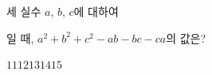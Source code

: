 세 실수 $a$, $b$, $c$에 대하여\par\smallskip{}\par\smallskip\noindent 일 때, $a^2+b^2+c^2-ab-bc-ca$의 값은?
\begin{choices32}{$11$}{$12$}{$13$}{$14$}{$15$}\end{choices32}
